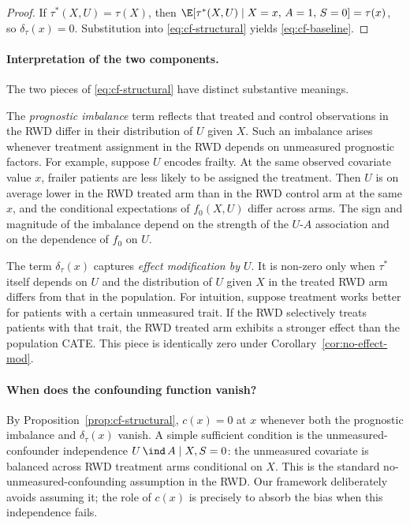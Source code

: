 \begin{proof}
If $\tau^*(X, U) = \tau(X)$, then $\E[\tau^*(X, U) \mid X = x,\, A = 1,\, S = 0] = \tau(x)$, so $\delta_\tau(x) = 0$.
Substitution into \eqref{eq:cf-structural} yields \eqref{eq:cf-baseline}.
\end{proof}

\paragraph{Interpretation of the two components.}
The two pieces of \eqref{eq:cf-structural} have distinct substantive meanings.

The \emph{prognostic imbalance} term reflects that treated and control observations in the RWD differ in their distribution of $U$ given $X$.
Such an imbalance arises whenever treatment assignment in the RWD depends on unmeasured prognostic factors.
For example, suppose $U$ encodes frailty.
At the same observed covariate value $x$, frailer patients are less likely to be assigned the treatment.
Then $U$ is on average lower in the RWD treated arm than in the RWD control arm at the same $x$, and the conditional expectations of $f_0(X, U)$ differ across arms.
The sign and magnitude of the imbalance depend on the strength of the $U$-$A$ association and on the dependence of $f_0$ on $U$.

The term $\delta_\tau(x)$ captures \emph{effect modification by $U$}.
It is non-zero only when $\tau^*$ itself depends on $U$ and the distribution of $U$ given $X$ in the treated RWD arm differs from that in the population.
For intuition, suppose treatment works better for patients with a certain unmeasured trait.
If the RWD selectively treats patients with that trait, the RWD treated arm exhibits a stronger effect than the population CATE.
This piece is identically zero under Corollary~\ref{cor:no-effect-mod}.

\paragraph{When does the confounding function vanish?}
By Proposition~\ref{prop:cf-structural}, $c(x) = 0$ at $x$ whenever both the prognostic imbalance and $\delta_\tau(x)$ vanish.
A simple sufficient condition is the unmeasured-confounder independence $U \,\ind\, A \mid X, S = 0$: the unmeasured covariate is balanced across RWD treatment arms conditional on $X$.
This is the standard no-unmeasured-confounding assumption in the RWD.
Our framework deliberately avoids assuming it; the role of $c(x)$ is precisely to absorb the bias when this independence fails.

